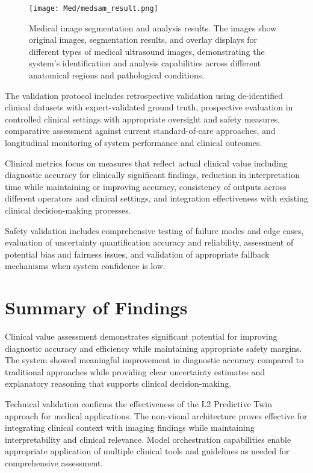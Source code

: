 \begin{figure}[htbp]
\centering
\texttt{[image: Med/medsam\_result.png]}
\caption{Medical image segmentation and analysis results. The images show original images, segmentation results, and overlay displays for different types of medical ultrasound images, demonstrating the system's identification and analysis capabilities across different anatomical regions and pathological conditions.}
\label{fig:medsam_result}
\end{figure}

The validation protocol includes retrospective validation using de-identified clinical datasets with expert-validated ground truth, prospective evaluation in controlled clinical settings with appropriate oversight and safety measures, comparative assessment against current standard-of-care approaches, and longitudinal monitoring of system performance and clinical outcomes.

Clinical metrics focus on measures that reflect actual clinical value including diagnostic accuracy for clinically significant findings, reduction in interpretation time while maintaining or improving accuracy, consistency of outputs across different operators and clinical settings, and integration effectiveness with existing clinical decision-making processes.

Safety validation includes comprehensive testing of failure modes and edge cases, evaluation of uncertainty quantification accuracy and reliability, assessment of potential bias and fairness issues, and validation of appropriate fallback mechanisms when system confidence is low.

\section{Summary of Findings}

Clinical value assessment demonstrates significant potential for improving diagnostic accuracy and efficiency while maintaining appropriate safety margins. The system showed meaningful improvement in diagnostic accuracy compared to traditional approaches while providing clear uncertainty estimates and explanatory reasoning that supports clinical decision-making.

Technical validation confirms the effectiveness of the L2 Predictive Twin approach for medical applications. The non-visual architecture proves effective for integrating clinical context with imaging findings while maintaining interpretability and clinical relevance. Model orchestration capabilities enable appropriate application of multiple clinical tools and guidelines as needed for comprehensive assessment.

